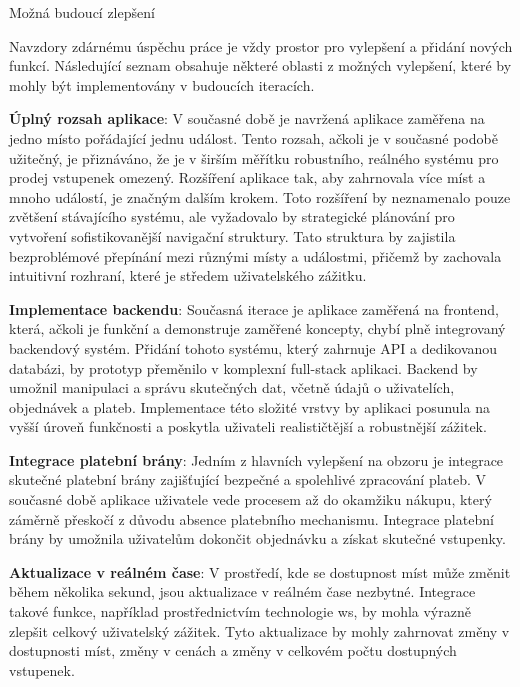 \begin{section}{Možná budoucí zlepšení}
    \label{sec:zaver-budoucnost}

    Navzdory zdárnému úspěchu práce je vždy prostor pro vylepšení a přidání nových funkcí.
    Následující seznam obsahuje některé oblasti z možných vylepšení, které by mohly být implementovány v budoucích iteracích.

    \textbf{Úplný rozsah aplikace}: V současné době je navržená aplikace zaměřena na jedno místo pořádající jednu událost.
    Tento rozsah, ačkoli je v současné podobě užitečný, je přiznáváno, že je v širším měřítku robustního, reálného systému pro prodej vstupenek omezený.
    Rozšíření aplikace tak, aby zahrnovala více míst a mnoho událostí, je značným dalším krokem.
    Toto rozšíření by neznamenalo pouze zvětšení stávajícího systému, ale vyžadovalo by strategické plánování pro vytvoření sofistikovanější navigační struktury.
    Tato struktura by zajistila bezproblémové přepínání mezi různými místy a událostmi, přičemž by zachovala intuitivní rozhraní, které je středem uživatelského zážitku.

    \textbf{Implementace backendu}: Současná iterace je aplikace zaměřená na frontend, která, ačkoli je funkční a demonstruje zaměřené koncepty, chybí plně integrovaný backendový systém.
    Přidání tohoto systému, který zahrnuje API a dedikovanou databázi, by prototyp přeměnilo v komplexní full-stack aplikaci.
    Backend by umožnil manipulaci a správu skutečných dat, včetně údajů o uživatelích, objednávek a plateb.
    Implementace této složité vrstvy by aplikaci posunula na vyšší úroveň funkčnosti a poskytla uživateli realističtější a robustnější zážitek.

    \textbf{Integrace platební brány}: Jedním z hlavních vylepšení na obzoru je integrace skutečné platební brány zajišťující bezpečné a spolehlivé zpracování plateb.
    V současné době aplikace uživatele vede procesem až do okamžiku nákupu, který záměrně přeskočí z důvodu absence platebního mechanismu.
    Integrace platební brány by umožnila uživatelům dokončit objednávku a získat skutečné vstupenky.

    \textbf{Aktualizace v reálném čase}: V prostředí, kde se dostupnost míst může změnit během několika sekund, jsou aktualizace v reálném čase nezbytné.
    Integrace takové funkce, například prostřednictvím technologie \ac{ws}, by mohla výrazně zlepšit celkový uživatelský zážitek.
    Tyto aktualizace by mohly zahrnovat změny v dostupnosti míst, změny v cenách a změny v celkovém počtu dostupných vstupenek.


\end{section}
